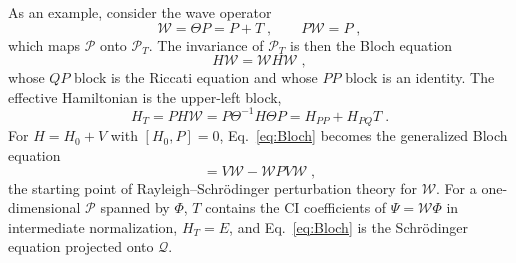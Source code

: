\documentclass[aip,jcp,reprint,noshowkeys,superscriptaddress]{revtex4-1}
\begin{document}
As an example, consider the wave operator
\begin{equation}
	\mathcal{W} = \Theta P = P + T \;,
	\qquad
	P\mathcal{W} = P \;,
\end{equation}
which maps $\mathcal{P}$ onto $\mathcal{P}_T$. The invariance of
$\mathcal{P}_T$ is then the Bloch equation\cite{Bloch1958,Brandow1967,ShavittBartlett2009}
\begin{equation}
	H\mathcal{W} = \mathcal{W}H\mathcal{W} \;,
	\label{eq:Bloch}
\end{equation}
whose $QP$ block is the Riccati equation and whose $PP$ block is an
identity. The effective Hamiltonian is
the upper-left block,
\begin{equation}
	\label{eq:H_T_riccati}
	H_T = PH\mathcal{W} = P\Theta^{-1}H\Theta P = H_{PP}+H_{PQ}T \;.
\end{equation}
For $H=H_0+V$ with $[H_0,P]=0$, Eq.~\eqref{eq:Bloch} becomes the
generalized Bloch equation
\begin{equation}
	[\mathcal{W},H_0] = V\mathcal{W}-\mathcal{W}PV\mathcal{W} \;,
\end{equation}
the starting point of Rayleigh--Schr\"odinger perturbation theory for
$\mathcal{W}$. For a one-dimensional $\mathcal{P}$ spanned by $\Phi$,
$T$ contains the CI coefficients of $\Psi=\mathcal{W}\Phi$ in intermediate
normalization, $H_T=E$, and Eq.~\eqref{eq:Bloch} is the
Schr\"odinger equation projected onto $\mathcal{Q}$.
\end{document}

